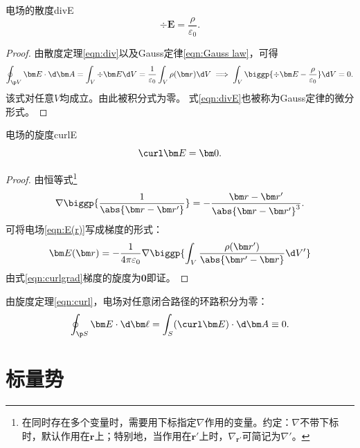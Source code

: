 \begin{theorem}{电场的散度}{divE}
    \begin{equation}
        \label{eqn:divE}
        \div\bm E=\frac\rho{\varepsilon_0}.
    \end{equation}
\end{theorem}

\begin{proof}
    由散度定理\eqref{eqn:div}以及Gauss定律\eqref{eqn:Gauss law}，可得
    \[
        \oint_{\p V}\bm E\cdot\d\bm A=\int_V\div\bm E\d V=\frac1{\varepsilon_0}\int_V\rho(\bm r)\d V\implies
        \int_V\biggp{\div\bm E-\frac\rho{\varepsilon_0}}\d V=0.
    \]
    该式对任意$V$均成立。由此被积分式为零。
    式\eqref{eqn:divE}也被称为Gauss定律的微分形式。
\end{proof}

\begin{theorem}
    {电场的旋度}{curlE}
    \begin{equation}
        \label{eqn:curlE}
        \curl\bm E=\bm 0.
    \end{equation}
\end{theorem}

\begin{proof}
    由恒等式\footnote{在同时存在多个变量时，需要用下标指定$\nabla$作用的变量。约定：$\nabla$不带下标时，默认作用在$\bm r$上；特别地，当作用在$\bm r'$上时，$\nabla_{\bm r'}$可简记为$\nabla'$。}
    \[
        \nabla\biggp{\frac1{\abs{\bm r-\bm r'}}}=-\frac{\bm r-\bm r'}{\abs{\bm r-\bm r'}^3}.
    \]
    可将电场\eqref{eqn:E(r)}写成梯度的形式：
    \begin{equation}
        \label{eqn:E(r)=grad}
        \bm E(\bm r)=-\frac1{4\pi\varepsilon_0}\nabla\biggp{\int_V\frac{\rho(\bm r')}{\abs{\bm r'-\bm r}}\d V'}
    \end{equation}
    由式\eqref{eqn:curlgrad}梯度的旋度为$\bm0$即证。
\end{proof}

\begin{corollary}
    由旋度定理\eqref{eqn:curl}，电场对任意闭合路径的环路积分为零：
    \begin{equation}
        \oint_{\p S}\bm E\cdot\d\bm\ell=\int_S(\curl\bm E)\cdot\d\bm A\equiv 0.
    \end{equation}
\end{corollary}

\section{标量势}

